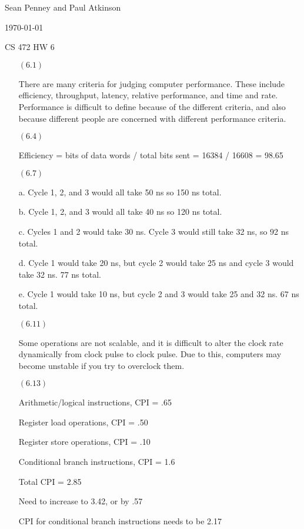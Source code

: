 \documentclass[letterpaper,10pt,titlepage]{article}
\def\name{Sean Penney and Paul Atkinson}
\begin{document}
\hfill \name

\hfill \today

\hfill CS 472 HW 6

\begin{enumerate}
\item[$(6.1)$] 

  There are many criteria for judging computer performance.
  These include efficiency, throughput, latency, relative performance, and time and rate.
  Performance is difficult to define because of the different criteria, and also because different people are concerned with different performance criteria.

\item[$(6.4)$]

  Efficiency = bits of data words / total bits sent = 16384 / 16608 = 98.65%
  
\item[$(6.7)$]

  a.  Cycle 1, 2, and 3 would all take 50 ns so 150 ns total.
  
  b.  Cycle 1, 2, and 3 would all take 40 ns so 120 ns total.
  
  c.  Cycles 1 and 2 would take 30 ns.  Cycle 3 would still take 32 ns, so 92 ns total.
  
  d.  Cycle 1 would take 20 ns, but cycle 2 would take 25 ns and cycle 3 would take 32 ns.  77 ns total.
  
  e.  Cycle 1 would take 10 ns, but cycle 2 and 3 would take 25 and 32 ns.  67 ns total.
  
\item[$(6.11)$]

  Some operations are not scalable, and it is difficult to alter the clock rate dynamically from clock pulse to clock pulse.
  Due to this, computers may become unstable if you try to overclock them.
  
\item[$(6.13)$]

  Arithmetic/logical instructions, CPI = .65
  
  Register load operations, CPI = .50
  
  Register store operations, CPI = .10
  
  Conditional branch instructions, CPI = 1.6
  
  Total CPI = 2.85
  
  Need to increase to 3.42, or by .57
  
  CPI for conditional branch instructions needs to be 2.17
  

\end{enumerate}
\end{document}
